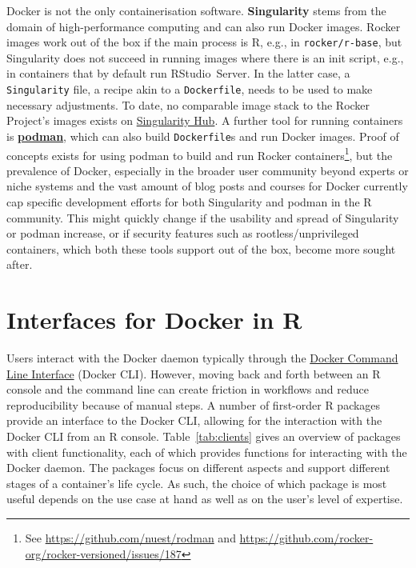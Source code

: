 Docker is not the only containerisation software. \textbf{Singularity}
stems from the domain of high-performance computing
\citep{kurtzer_singularity_2017} and can also run Docker images. Rocker
images work out of the box if the main process is R, e.g., in
\texttt{rocker/r-base}, but Singularity does not succeed in running
images where there is an init script, e.g., in containers that by
default run RStudio~Server. In the latter case, a \texttt{Singularity}
file, a recipe akin to a \texttt{Dockerfile}, needs to be used to make
necessary adjustments. To date, no comparable image stack to the Rocker
Project's images exists on
\href{https://singularity-hub.org/}{Singularity Hub}. A further tool for
running containers is
\href{https://github.com/containers/libpod}{\textbf{podman}}, which can
also build \texttt{Dockerfile}s and run Docker images. Proof of concepts
exists for using podman to build and run Rocker
containers\footnote{See \href{https://github.com/nuest/rodman}{https://github.com/nuest/rodman} and \href{https://github.com/rocker-org/rocker-versioned/issues/187}{https://github.com/rocker-org/rocker-versioned/issues/187}},
but the prevalence of Docker, especially in the broader user community
beyond experts or niche systems and the vast amount of blog posts and
courses for Docker currently cap specific development efforts for both
Singularity and podman in the R community. This might quickly change if
the usability and spread of Singularity or podman increase, or if
security features such as rootless/unprivileged containers, which both
these tools support out of the box, become more sought after.

\hypertarget{interfaces-for-docker-in-r}{%
\section{Interfaces for Docker in R}\label{interfaces-for-docker-in-r}}

\label{interfaces}

Users interact with the Docker daemon typically through the
\href{https://docs.docker.com/engine/reference/commandline/cli/}{Docker
Command Line Interface} (Docker CLI). However, moving back and forth
between an R console and the command line can create friction in
workflows and reduce reproducibility because of manual steps. A number
of first-order R packages provide an interface to the Docker CLI,
allowing for the interaction with the Docker CLI from an R console.
Table~\ref{tab:clients} gives an overview of packages with client
functionality, each of which provides functions for interacting with the
Docker daemon. The packages focus on different aspects and support
different stages of a container's life cycle. As such, the choice of
which package is most useful depends on the use case at hand as well as
on the user's level of expertise.

